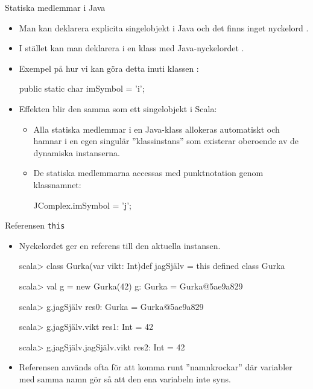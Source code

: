 \begin{Slide}{Statiska medlemmar i Java}
\begin{itemize}
\item Man kan  deklarera explicita singelobjekt i Java och det finns inget nyckelord .

\item I stället kan man deklarera  i en klass med Java-nyckelordet .

\item Exempel på hur vi kan göra detta inuti klassen :

\begin{Code}[language=Java,basicstyle=\SlideFontSize{10}{12}\ttfamily\selectfont]
    public static char imSymbol = 'i';
\end{Code}

\item Effekten blir den samma som ett singelobjekt i Scala:
\begin{itemize}
\item Alla statiska medlemmar i en Java-klass allokeras automatiskt och hamnar i en egen singulär ''klassinstans'' som existerar oberoende av de dynamiska instanserna.
\item De statiska medlemmarna accessas med punktnotation genom klassnamnet:
\begin{Code}[language=Java,basicstyle=\SlideFontSize{11}{13}\ttfamily\selectfont]
    JComplex.imSymbol = 'j';
\end{Code}

\end{itemize}


\end{itemize}
\end{Slide}



\begin{Slide}{Referensen \texttt{this}}\SlideFontSmall
\begin{itemize}
\item Nyckelordet  ger en referens till den aktuella instansen.
\begin{REPLnonum}
scala> class Gurka(var vikt: Int){def jagSjälv = this}
defined class Gurka

scala> val g = new Gurka(42)
g: Gurka = Gurka@5ae9a829

scala> g.jagSjälv
res0: Gurka = Gurka@5ae9a829

scala> g.jagSjälv.vikt
res1: Int = 42

scala> g.jagSjälv.jagSjälv.vikt
res2: Int = 42
\end{REPLnonum}
\item Referensen  används ofta för att komma runt ''namnkrockar'' där variabler med samma namn gör så att den ena variabeln inte syns.
\end{itemize}
\end{Slide}




